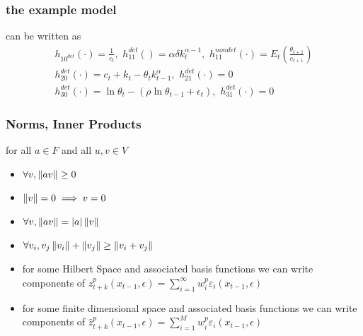 \documentclass[tikz]{beamer}
\begin{document}
\begin{frame}
\frametitle{the example  model }
\label{sec:simple-rbc-model-ext} can be written as
\begin{gather}
h_{10^{det}}(\cdot)=\frac{1}{c_t},\,\,
h_{11}^{det}()=\alpha \delta k_{t}^{\alpha-1} ,\,\,
h_{11}^{nondet}(\cdot)=E_t \left (\frac{\theta_{t+1}}{c_{t+1}} \right )\\
h_{20}^{det}(\cdot)=c_t + k_t-\theta_tk_{t-1}^\alpha,\,\,
h_{21}^{det}(\cdot)=0\\
h_{30}^{det}(\cdot)=\ln \theta_t -(\rho \ln \theta_{t-1} + \epsilon_t),\,\,
h_{31}^{det}(\cdot)=0
\end{gather}

\end{frame}

\begin{frame}
  \frametitle{Norms, Inner Products}

for all $a \in F$  and all $u, v \in V$
  \begin{itemize}
 \item $\forall v, \left\lVert a v\right\rVert \ge 0$
 \item $\left\lVert v\right\rVert =0 \implies v=0$
  \item $\forall v, \left\lVert a v\right\rVert = |a| \left\lVert v\right\rVert$
  \item $\forall v_i,v_j \left\lVert v_i\right\rVert +  \left\lVert v_j\right\rVert \ge  \left\lVert v_i+v_j\right\rVert$
  \item for some Hilbert Space and associated  basis functions we can write components of $z_{t+k}^p(x_{t-1},\epsilon)= \sum_{i=1}^\infty w^p_i\varepsilon_i(x_{t-1},\epsilon)$ 
  \item for some finite dimensional space and associated 
 basis functions we can write components of $\hat{z}_{t+k}^p(x_{t-1},\epsilon)= \sum_{i=1}^M w^p_i\varepsilon_i(x_{t-1},\epsilon)$ 
  \end{itemize}
\end{frame}
\end{document}
